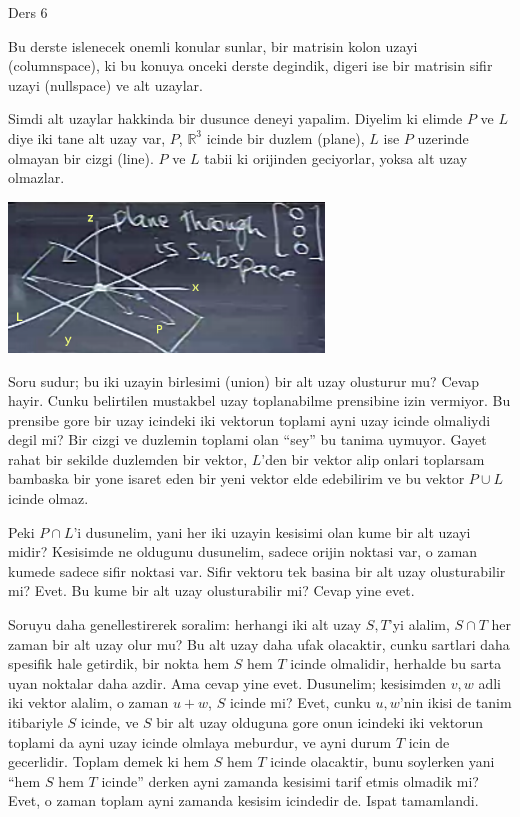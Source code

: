 \documentclass[12pt,fleqn]{article}\usepackage{../common}
\begin{document}
Ders 6

Bu derste islenecek onemli konular sunlar, bir matrisin kolon uzayi
(columnspace), ki bu konuya onceki derste degindik, digeri ise bir
matrisin sifir uzayi (nullspace) ve alt uzaylar. 

Simdi alt uzaylar hakkinda bir dusunce deneyi yapalim. Diyelim ki elimde $P$
ve $L$ diye iki tane alt uzay var, $P$, $\mathbb{R}^3$ icinde bir duzlem
(plane), $L$ ise $P$ uzerinde olmayan bir cizgi (line). $P$ ve $L$ tabii ki
orijinden geciyorlar, yoksa alt uzay olmazlar. 

\includegraphics[height=4cm]{6_01.png}

Soru sudur; bu iki uzayin birlesimi (union) bir alt uzay olusturur mu?
Cevap hayir. Cunku belirtilen mustakbel uzay toplanabilme prensibine izin
vermiyor. Bu prensibe gore bir uzay icindeki iki vektorun toplami ayni uzay
icinde olmaliydi degil mi? Bir cizgi ve duzlemin toplami olan ``sey'' bu
tanima uymuyor. Gayet rahat bir sekilde duzlemden bir vektor, $L$'den bir
vektor alip onlari toplarsam bambaska bir yone isaret eden bir yeni vektor
elde edebilirim ve bu vektor $P \cup L$ icinde olmaz.

Peki $P \cap L$'i dusunelim, yani her iki uzayin kesisimi olan kume bir
alt uzayi midir? Kesisimde ne oldugunu dusunelim, sadece orijin noktasi
var, o zaman kumede sadece sifir noktasi var. Sifir vektoru tek basina bir
alt uzay olusturabilir mi? Evet. Bu kume bir alt uzay olusturabilir mi?
Cevap yine evet. 

Soruyu daha genellestirerek soralim: herhangi iki alt uzay $S,T$'yi alalim,
$S \cap T$ her zaman bir alt uzay olur mu? Bu alt uzay daha ufak olacaktir,
cunku sartlari daha spesifik hale getirdik, bir nokta hem $S$ hem $T$
icinde olmalidir, herhalde bu sarta uyan noktalar daha azdir. Ama cevap
yine evet. Dusunelim; kesisimden $v,w$ adli iki vektor alalim, o zaman
$u + w$, $S$ icinde mi? Evet, cunku $u,w$'nin ikisi de tanim itibariyle $S$
icinde, ve $S$ bir alt uzay olduguna gore onun icindeki iki vektorun
toplami da ayni uzay icinde olmlaya meburdur, ve ayni durum $T$ icin de
gecerlidir. Toplam demek ki hem $S$ hem $T$ icinde olacaktir, bunu
soylerken yani ``hem $S$ hem $T$ icinde'' derken ayni zamanda kesisimi
tarif etmis olmadik mi? Evet, o zaman toplam ayni zamanda kesisim icindedir
de. Ispat tamamlandi. 
\end{document}
